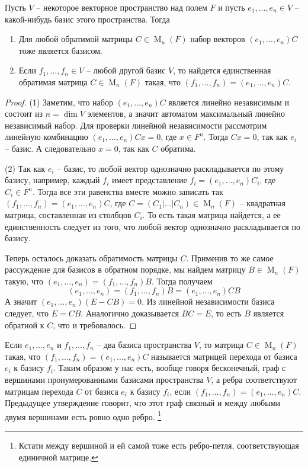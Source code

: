 \begin{claim}
\label{claim::BasisClassification}
Пусть $V$ -- некоторое векторное пространство над полем $F$ и пусть $e_1,\ldots, e_n\in V$ -- какой-нибудь базис этого пространства.
Тогда
\begin{enumerate}
\item Для любой обратимой матрицы $C\in \operatorname{M}_{n}(F)$ набор векторов $(e_1,\ldots,e_n)C$ тоже является базисом.

\item Если $f_1,\ldots,f_n\in V$ -- любой другой базис $V$, то найдется единственная обратимая матрица $C\in\operatorname{M}_n(F)$ такая, что $(f_1,\ldots,f_n) = (e_1,\ldots,e_n)C$.
\end{enumerate}
\end{claim}
\begin{proof}
(1) Заметим, что набор $(e_1,\ldots,e_n)C$ является линейно независимым и состоит из $n = \dim V$ элементов, а значит автоматом максимальный линейно независимый набор.
Для проверки линейной независимости рассмотрим линейную комбинацию $(e_1,\ldots,e_n)Cx = 0$, где $x\in F^n$.
Тогда $Cx = 0$, так как $e_i$ -- базис.
А следовательно $x = 0$, так как $C$ обратима.

(2) Так как $e_i$ -- базис, то любой вектор однозначно раскладывается по этому базису, например, каждый $f_i$ имеет представление $f_i = (e_1,\ldots, e_n) C_i$, где $C_i\in F^n$.
Тогда все эти равенства вместе можно записать так $(f_1,\ldots,f_n) = (e_1,\ldots,e_n) C$, где $C = (C_1|\ldots|C_n)\in \operatorname{M}_n (F)$ -- квадратная матрица, составленная из столбцов $C_i$.
То есть такая матрица найдется, а ее единственность следует из того, что любой вектор однозначно раскладывается по базису.

Теперь осталось доказать обратимость матрицы $C$.
Применив то же самое рассуждение для базисов в обратном порядке, мы найдем матрицу $B\in \operatorname{M}_n(F)$ такую, что $(e_1,\ldots,e_n) = (f_1,\ldots,f_n) B$.
Тогда получаем 
\[
(e_1,\ldots,e_n) = (f_1,\ldots,f_n)B = (e_1,\ldots,e_n)CB
\]
А значит $(e_1,\ldots, e_n)(E - CB) = 0$.
Из линейной независимости базиса следует, что $E = CB$.
Аналогично доказывается $BC = E$, то есть $B$ является обратной к $C$, что и требовалось. %
\end{proof}


Если $e_1,\ldots,e_n$ и $f_1,\ldots,f_n$ -- два базиса пространства $V$, то матрица $C\in \operatorname{M}_n(F)$ такая, что $(f_1,\ldots, f_n) = (e_1,\ldots,e_n)C$ называется матрицей перехода от базиса $e_i$ к базису $f_i$.
Таким образом у нас есть, вообще говоря бесконечный, граф с вершинами пронумерованными базисами пространства $V$, а ребра соответствуют матрицам перехода $C$ от базиса $e_i$ к базису $f_i$, если $(f_1,\ldots,f_n) = (e_1,\ldots,e_n)C$.
Предыдущее утверждение говорит, что этот граф связный и между любыми двумя вершинами есть ровно одно ребро.%
\footnote{Кстати между вершиной и ей самой тоже есть ребро-петля, соответствующая единичной матрице.}

